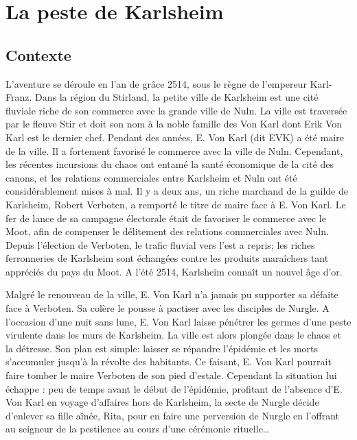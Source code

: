 \documentclass[french,oneside]{wfrp}
\begin{document}
\chapter{La peste de Karlsheim}

\section{Contexte}

L’aventure se déroule en l’an de grâce 2514, sous le règne de
l’empereur Karl-Franz.  Dans la région du Stirland, la petite ville de
Karlsheim est une cité fluviale riche de son commerce avec la grande
ville de Nuln. La ville est traversée par le fleuve Stir et doit son
nom à la noble famille des Von Karl dont Erik Von Karl est le dernier
chef. Pendant des années, E. Von Karl (dit EVK) a été maire de la
ville. Il a fortement favorisé le commerce avec la ville de
Nuln. Cependant, les récentes incursions du chaos ont entamé la santé
économique de la cité des canons, et les relations commerciales entre
Karlsheim et Nuln ont été considérablement mises à mal. Il y a deux
ans, un riche marchand de la guilde de Karlsheim, Robert Verboten, a
remporté le titre de maire face à E. Von Karl. Le fer de lance de sa
campagne électorale était de favoriser le commerce avec le Moot, afin
de compenser le délitement des relations commerciales avec
Nuln. Depuis l’élection de Verboten, le trafic fluvial vers l’est a
repris; les riches ferronneries de Karlsheim sont échangées contre les
produits maraîchers tant appréciés du pays du Moot. A l’été 2514,
Karlsheim connaît un nouvel âge d’or.

Malgré le renouveau de la ville, E. Von Karl n’a jamais pu supporter
sa défaite face à Verboten. Sa colère le pousse à pactiser avec les
disciples de Nurgle. A l’occasion d’une nuit sans lune, E. Von Karl
laisse pénétrer les germes d’une peste virulente dans les murs de
Karlsheim. La ville est alors plongée dans le chaos et la
détresse. Son plan est simple: laisser se répandre l’épidémie et les
morts s’accumuler jusqu’à la révolte des habitants. Ce faisant, E. Von
Karl pourrait faire tomber le maire Verboten de son pied d’estale.
Cependant la situation lui échappe : peu de temps avant le début de
l’épidémie, profitant de l’absence d’E. Von Karl en voyage d'affaires
hors de Karlsheim, la secte de Nurgle décide d’enlever sa fille aînée,
Rita, pour en faire une perversion de Nurgle en l'offrant au seigneur
de la pestilence au cours d’une cérémonie rituelle\dots

\newpage
\end{document}
